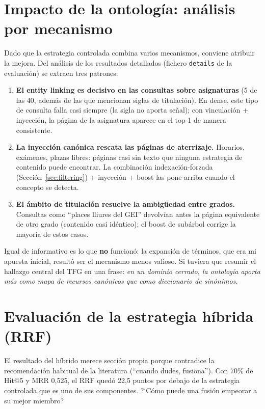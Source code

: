 \documentclass[12pt, a4paper, twoside]{report}
\begin{document}
\section{Impacto de la ontolog\'ia: an\'alisis por mecanismo}
\label{sec:impacto-ontologia}

Dado que la estrategia controlada combina varios mecanismos, conviene atribuir la mejora. Del an\'alisis de los resultados detallados (fichero \texttt{details} de la evaluaci\'on) se extraen tres patrones:

\begin{enumerate}
  \item \textbf{El entity linking es decisivo en las consultas sobre asignaturas} (5 de las 40, adem\'as de las que mencionan siglas de titulaci\'on). En dense, este tipo de consulta falla casi siempre (la sigla no aporta se\~nal); con vinculaci\'on + inyecci\'on, la p\'agina de la asignatura aparece en el top-1 de manera consistente.
  \item \textbf{La inyecci\'on can\'onica rescata las p\'aginas de aterrizaje.} Horarios, ex\'amenes, plazas libres: p\'aginas casi sin texto que ninguna estrategia de contenido puede encontrar. La combinaci\'on indexaci\'on-forzada (Secci\'on~\ref{sec:filtering}) + inyecci\'on + boost las pone arriba cuando el concepto se detecta.
  \item \textbf{El \'ambito de titulaci\'on resuelve la ambig\"uedad entre grados.} Consultas como ``places lliures del GEI'' devolv\'ian antes la p\'agina equivalente de otro grado (contenido casi id\'entico); el boost de sub\'arbol corrige la mayor\'ia de estos casos.
\end{enumerate}

Igual de informativo es lo que \textbf{no} funcion\'o: la expansi\'on de t\'erminos, que era mi apuesta inicial, result\'o ser el mecanismo menos valioso. Si tuviera que resumir el hallazgo central del TFG en una frase: \textit{en un dominio cerrado, la ontolog\'ia aporta m\'as como mapa de recursos can\'onicos que como diccionario de sin\'onimos}.

\section{Evaluaci\'on de la estrategia h\'ibrida (RRF)}
\label{sec:eval-hybrid}

El resultado del h\'ibrido merece secci\'on propia porque contradice la recomendaci\'on habitual de la literatura (``cuando dudes, fusiona''). Con 70\% de Hit@5 y MRR 0,525, el RRF qued\'o 22,5 puntos por debajo de la estrategia controlada que es uno de sus componentes. ?`C\'omo puede una fusi\'on empeorar a su mejor miembro?
\end{document}
